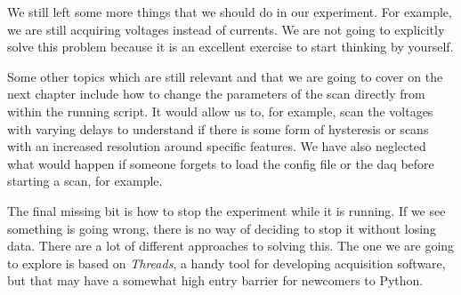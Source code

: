 We still left some more things that we should do in our experiment. For example, we are still acquiring voltages instead of currents. We are not going to explicitly solve this problem because it is an excellent exercise to start thinking by yourself.


Some other topics which are still relevant and that we are going to cover on the next chapter include how to change the parameters of the scan directly from within the running script. It would allow us to, for example, scan the voltages with varying delays to understand if there is some form of hysteresis or scans with an increased resolution around specific features. We have also neglected what would happen if someone forgets to load the config file or the daq before starting a scan, for example.

The final missing bit is how to stop the experiment while it is running. If we see something is going wrong, there is no way of deciding to stop it without losing data. There are a lot of different approaches to solving this. The one we are going to explore is based on \emph{Threads}, a handy tool for developing acquisition software, but that may have a somewhat high entry barrier for newcomers to Python.
